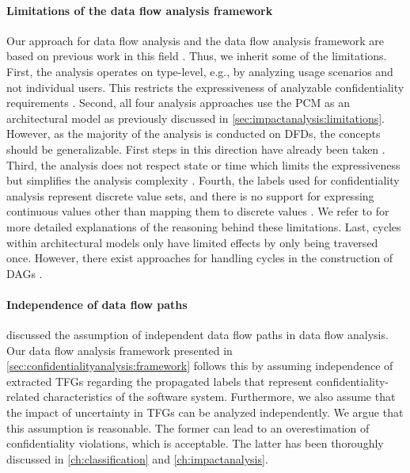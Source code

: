 \paragraph{Limitations of the data flow analysis framework}
Our approach for data flow analysis and the data flow analysis framework \cite{boltz_extensible_2024} are based on previous work in this field \cite{seifermann_architectural_2016,seifermann_identifying_2021,seifermann_unified_2021,seifermann_data-driven_2019,seifermann_detecting_2022,seifermann_architectural_2022,schneider_how_2024,schneider_microsecend_2023}.
Thus, we inherit some of the limitations.
First, the analysis operates on type-level, e.g., by analyzing usage scenarios and not individual users.
This restricts the expressiveness of analyzable confidentiality requirements \cite{seifermann_architectural_2022}.
Second, all four analysis approaches use the \ac{PCM} as an architectural model as previously discussed in \autoref{sec:impactanalysis:limitations}.
However, as the majority of the analysis is conducted on \acp{DFD}, the concepts should be generalizable.
First steps in this direction have already been taken \cite{boltz_extensible_2024}.
Third, the analysis does not respect state or time which limits the expressiveness but simplifies the analysis complexity \cite{seifermann_architectural_2022}.
Fourth, the labels used for confidentiality analysis represent discrete value sets, and there is no support for expressing continuous values other than mapping them to discrete values \cite{seifermann_architectural_2022}.
We refer to \textcite{seifermann_architectural_2022} for more detailed explanations of the reasoning behind these limitations.
Last, cycles within architectural models only have limited effects by only being traversed once.
However, there exist approaches for handling cycles in the construction of \acp{DAG} \cite{kramer_combining_1994,arp_analyzing_2024}.

\paragraph{Independence of data flow paths}
\textcite{seifermann_architectural_2022} discussed the assumption of independent data flow paths in data flow analysis.
Our data flow analysis framework presented in \autoref{sec:confidentialityanalysis:framework} follows this by assuming independence of extracted \acp{TFG} regarding the propagated labels that represent confidentiality-related characteristics of the software system.
Furthermore, we also assume that the impact of uncertainty in \acp{TFG} can be analyzed independently.
We argue that this assumption is reasonable.
The former can lead to an overestimation of confidentiality violations, which is acceptable.
The latter has been thoroughly discussed in \autoref{ch:classification} and \autoref{ch:impactanalysis}.

